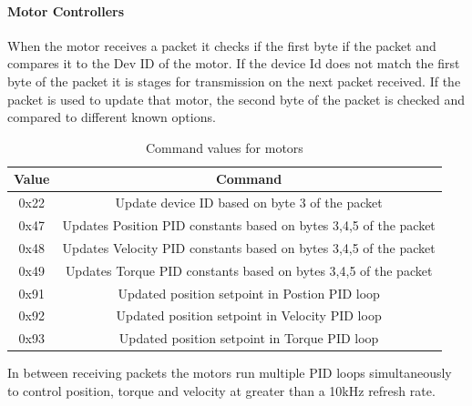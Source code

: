         \paragraph{Motor Controllers}
            When the motor receives a packet it checks if the first byte if the packet and compares it to the Dev ID of the motor. If the device Id does not match the first byte of the packet it is stages for transmission on the next packet received. If the packet is used to update that motor, the second byte of the packet is checked and compared to different known options. 
            \begin{table}[H]
                \centering
                \begin{tabular}{|c|c|}
                \hline
                    Value & Command \\
                    \hline
                    0x22 & Update device ID based on byte 3 of the packet\\
                    0x47 & Updates Position PID constants based on bytes 3,4,5 of the packet \\
                    0x48 & Updates Velocity PID constants based on bytes 3,4,5 of the packet \\
                    0x49 & Updates Torque PID constants based on bytes 3,4,5 of the packet \\
                    0x91 & Updated position setpoint in Postion PID loop\\
                    0x92 & Updated position setpoint in Velocity PID loop\\
                    0x93 & Updated position setpoint in Torque PID loop\\
                    \hline
                    \end{tabular}
                \caption{Command values for motors}
                \label{tab:ServoCommandValues}
            \end{table}
            In between receiving packets the motors run multiple PID loops simultaneously to control position, torque and velocity at greater than  a 10kHz refresh rate.

